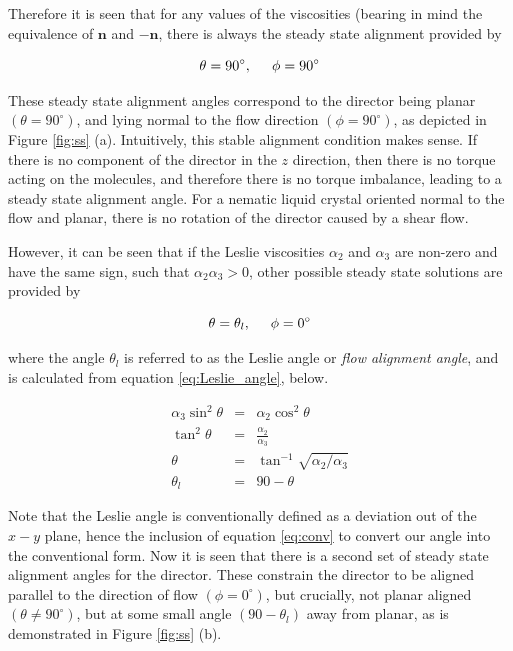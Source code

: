 Therefore it is seen that for any values of the viscosities (bearing in mind the equivalence of $\mathbf{n}$ and $-\mathbf{n}$, there is always the steady state alignment provided by

\begin{equation}
\theta=90^{\circ},\hspace{0.5cm}\phi=90^{\circ}
\label{eq:ss_1}
\end{equation}

\noindent These steady state alignment angles correspond to the director being planar $\left(\theta=90^{\circ}\right)$, and lying normal to the flow direction $\left(\phi=90^{\circ}\right)$, as depicted in Figure \ref{fig:ss} (a). Intuitively, this stable alignment condition makes sense. If there is no component of the director in the $z$ direction, then there is no torque acting on the molecules, and therefore there is no torque imbalance, leading to a steady state alignment angle. For a nematic liquid crystal oriented normal to the flow and planar, there is no rotation of the director caused by a shear flow.

However, it can be seen that if the Leslie viscosities $\alpha_2$ and $\alpha_3$ are non-zero and have the same sign, such that $\alpha_2\alpha_3>0$, other possible steady state solutions are provided by

\begin{equation}
\theta=\theta_l,\hspace{0.5cm}\phi=0^{\circ}
\label{eq:ss_2}
\end{equation}

\noindent where the angle $\theta_l$ is referred to as the Leslie angle or \textit{flow alignment angle}, and is calculated from equation \ref{eq:Leslie_angle}, below.

\begin{eqnarray}
\nonumber\alpha_3\sin^2\theta&=&\alpha_2\cos^2\theta\\
\nonumber\tan^2\theta&=&\frac{\alpha_2}{\alpha_3}\\
\theta&=&\tan^{-1}\sqrt{\alpha_2/\alpha_3}\label{eq:Leslie_angle}\\
\theta_l&=&90-\theta\label{eq:conv}
\end{eqnarray}

\noindent Note that the Leslie angle is conventionally defined as a deviation out of the $x-y$ plane, hence the inclusion of equation \ref{eq:conv} to convert our angle into the conventional form. Now it is seen that there is a second set of steady state alignment angles for the director. These constrain the director to be aligned parallel to the direction of flow $\left(\phi=0^{\circ}\right)$, but crucially, not planar aligned $\left(\theta\neq90^{\circ}\right)$, but at some small angle $\left(90-\theta_l\right)$ away from planar, as is demonstrated in Figure \ref{fig:ss} (b).

